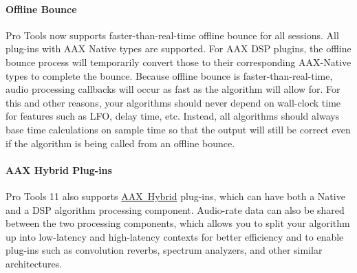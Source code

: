 \hypertarget{a00830_subsubsection__offline_bounce}{}\paragraph{Offline Bounce}\label{a00830_subsubsection__offline_bounce}
 Pro Tools now supports faster-\/than-\/real-\/time offline bounce for all sessions. All plug-\/ins with A\+AX Native types are supported. For A\+AX D\+SP plugins, the offline bounce process will temporarily convert those to their corresponding A\+A\+X-\/\+Native types to complete the bounce. Because offline bounce is faster-\/than-\/real-\/time, audio processing callbacks will occur as fast as the algorithm will allow for. For this and other reasons, your algorithms should never depend on wall-\/clock time for features such as L\+FO, delay time, etc. Instead, all algorithms should always base time calculations on sample time so that the output will still be correct even if the algorithm is being called from an offline bounce.

\hypertarget{a00830_subsubsection__aax-hybrid_plug-ins}{}\paragraph{A\+A\+X Hybrid Plug-\/ins}\label{a00830_subsubsection__aax-hybrid_plug-ins}
 Pro Tools 11 also supports \mbox{\hyperlink{a00805}{A\+AX Hybrid}} plug-\/ins, which can have both a Native and a D\+SP algorithm processing component. Audio-\/rate data can also be shared between the two processing components, which allows you to split your algorithm up into low-\/latency and high-\/latency contexts for better efficiency and to enable plug-\/ins such as convolution reverbs, spectrum analyzers, and other similar architectures.



